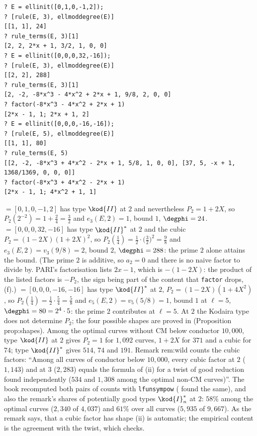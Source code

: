 \begin{sloppypar}
\begin{example}\label{ex:computation:wild-two}
\begin{lstlisting}[language=GP]
? E = ellinit([0,1,0,-1,2]);
? [rule(E, 3), ellmoddegree(E)]
[[1, 1], 24]
? rule_terms(E, 3)[1]
[2, 2, 2*x + 1, 3/2, 1, 0, 0]
? E = ellinit([0,0,0,32,-16]);
? [rule(E, 3), ellmoddegree(E)]
[[2, 2], 288]
? rule_terms(E, 3)[1]
[2, -2, -8*x^3 - 4*x^2 + 2*x + 1, 9/8, 2, 0, 0]
? factor(-8*x^3 - 4*x^2 + 2*x + 1)
[2*x - 1, 1; 2*x + 1, 2]
? E = ellinit([0,0,0,-16,-16]);
? [rule(E, 5), ellmoddegree(E)]
[[1, 1], 80]
? rule_terms(E, 5)
[[2, -2, -8*x^3 + 4*x^2 - 2*x + 1, 5/8, 1, 0, 0], [37, 5, -x + 1, 1368/1369, 0, 0, 0]]
? factor(-8*x^3 + 4*x^2 - 2*x + 1)
[2*x - 1, 1; 4*x^2 + 1, 1]
\end{lstlisting}
 $=[0,1,0,-1,2]$ has type $\kod{II}$ at $2$ and nevertheless $P_2=1+2X$, so $P_2(2^{-2})=1+\frac24=\frac32$ and $e_3(E,2)=1$, bound $1$, $\degphi=24$.  $=[0,0,0,32,-16]$ has type $\kod{II}^*$ at
$2$ and the cubic $P_2=(1-2X)(1+2X)^2$, so $P_2(\frac14)=\frac12\cdot\bigl(\frac32\bigr)^2=\frac98$ and $e_3(E,2)=v_3(9/8)=2$, bound $2$, $\degphi=288$: the prime $2$ alone attains the bound. (The prime $2$ is additive, so $a_2=0$ and there is no naive factor to divide by. PARI's factorisation lists $2x-1$, which is $-(1-2X)$:
the product of the listed factors is $-P_2$, the sign being part of the content that \texttt{factor} drops, (f).)  $=[0,0,0,-16,-16]$ has
type $\kod{II}^*$ at $2$, $P_2=(1-2X)(1+4X^2)$, so $P_2(\frac14)=\frac12\cdot\frac54=\frac58$ and $e_5(E,2)=v_5(5/8)=1$, bound $1$ at $\ell=5$, $\degphi=80=2^4\cdot5$: the prime $2$ contributes at $\ell=5$. At $2$ the
Kodaira type does not determine $P_2$; the four possible shapes are proved in  (Proposition prop:shapes). Among the optimal
curves without CM below conductor $10{,}000$, type $\kod{II}$ at $2$ gives $P_2=1$ for $1{,}092$ curves, $1+2X$ for $371$ and a cubic for $74$; type $\kod{II}^*$
gives $514$, $74$ and $191$. Remark rem:wild counts the cubic factors: ``Among all curves of conductor below $10{,}000$, every cubic factor at $2$
($1{,}143$) and at $3$ ($2{,}283$) equals the formula of (ii) for a twist of good reduction found independently ($534$ and $1{,}308$ among the optimal non-CM
curves)''. The book recomputed both pairs of counts with \texttt{lfunsympow} ( found the same), and also the remark's shares of
potentially good types $\kod{I}_n^*$ at $2$: $58\%$ among the optimal curves ($2{,}340$ of $4{,}037$) and $61\%$ over all curves ($5{,}935$ of $9{,}667$). As the
remark says, that a cubic factor has shape (ii) is automatic; the empirical content is the agreement with the twist, which  checks.
\end{example}


\end{sloppypar}
